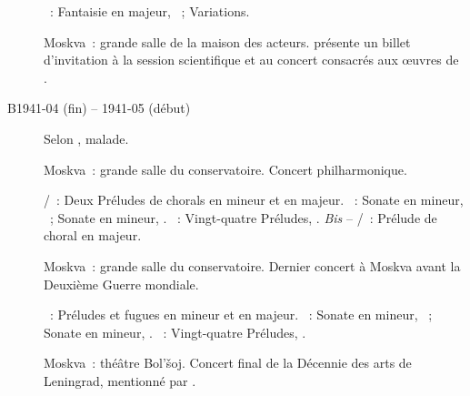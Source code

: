 \begin{description}
 \textsc{\Schumann{}}~: Fantaisie en \kC majeur, ~; Variations.
 \item[\DateWithWeekDay{1941-04-25}]
 Moskva~: grande salle de la maison des acteurs.
 \citet{Lazarev20} présente un billet d'invitation à la session scientifique
 et au concert consacrés aux œuvres de \Scriabine{}.
 \item[B1941-04 (fin) -- 1941-05 (début)]
 Selon \ASofronitsky{}, \VSofronitsky{} malade.
 \item[\DateWithWeekDay{1941-05-22}]
 Moskva~: grande salle du conservatoire.
 Concert philharmonique.

 \textsc{\JBach{}/\Busoni{}}~: Deux Préludes de chorals en \kG mineur et en
 \kG majeur.
 \textsc{\Beethoven{}}~: Sonate en \kF mineur, ~; Sonate en \kC
 mineur, .
 \textsc{\Chopin{}}~: Vingt-quatre Préludes, .
 \emph{Bis} -- \textsc{\JBach{}/\Busoni{}}~: Prélude de choral en \kG
 majeur.
 \item[\DateWithWeekDay{1941-05-25}]
 Moskva~: grande salle du conservatoire.
 Dernier concert à Moskva avant la Deuxième Guerre mondiale.

 \textsc{\JBach{}}~: Préludes et fugues en \kG mineur et en \kG majeur.
 \textsc{\Beethoven{}}~: Sonate en \kF mineur, ~; Sonate en \kC
 mineur, .
 \textsc{\Chopin{}}~: Vingt-quatre Préludes, .
 \item[\DateWithWeekDay{1941-05-26}]
 Moskva~: théâtre Bol'šoj.
 Concert final de la Décennie des arts de Leningrad, mentionné par
 \citet[p.~163]{Nekrasova08}.


\end{description}
